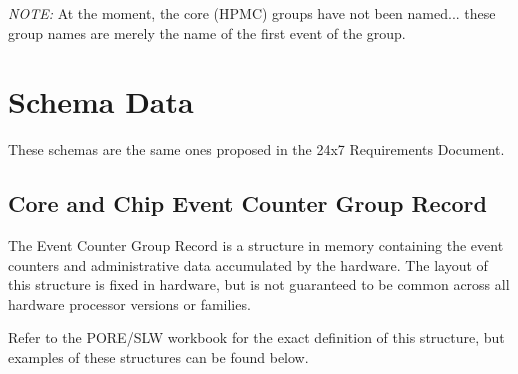 \documentclass[14]{article}
\begin{document}
\textit{NOTE:} At the moment, the core (HPMC) groups have not been named... these
group names are merely the name of the first event of the group.

\pagebreak

\section{Schema Data}
These schemas are the same ones proposed in the 24x7 Requirements Document.

\subsection{Core and Chip Event Counter Group Record}
The Event Counter Group Record is a structure in memory containing the event
counters and administrative data accumulated by the hardware. The layout of this
structure is fixed in hardware, but is not guaranteed to be common across all
hardware processor versions or families.

Refer to the PORE/SLW workbook for the exact definition of this structure, but
examples of these structures can be found below.
\end{document}
